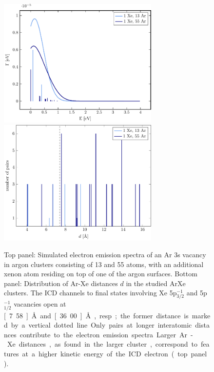 \begin{figure}[H]
 \centering
 \includegraphics[width=8.0cm]{pics/surf.pdf}\\
 \includegraphics[width=8.0cm]{pics/R_comp.pdf}
 \caption{
 Top panel: Simulated electron emission spectra of an Ar 3s vacancy in 
          argon clusters
          consisting of 13 and 55 atoms, with an additional xenon atom residing
          on top of one of the argon surfaces.
          Bottom panel: Distribution of Ar-Xe distances $d$ in the studied ArXe
          clusters. The ICD channels to final states involving Xe 5p$_{3/2}^{-1}$ and 
          5p$_{1/2}^{-1}$ vacancies open at \unit[7.58]{\AA} and
          \unit[36.00]{\AA}, resp.; the former distance is marked by a vertical dotted line. 
          Only pairs at longer interatomic
          distances contribute to the electron emission spectra.
          Larger Ar-Xe distances, as found in the larger cluster,
          correspond to features at a higher kinetic energy of
          the ICD electron (top panel).}
 \label{figure:surf}
\end{figure}


